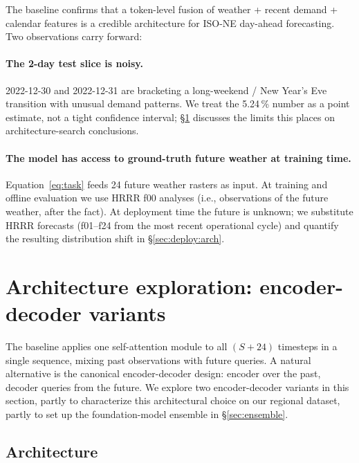 The baseline confirms that a token-level fusion of weather + recent demand + calendar features is a credible architecture for ISO-NE day-ahead forecasting. Two observations carry forward:

\paragraph{The 2-day test slice is noisy.} 2022-12-30 and 2022-12-31 are bracketing a long-weekend / New Year's Eve transition with unusual demand patterns. We treat the 5.24\,\% number as a point estimate, not a tight confidence interval; \S\ref{sec:archsearch} discusses the limits this places on architecture-search conclusions.

\paragraph{The model has access to ground-truth future weather at training time.} Equation~\ref{eq:task} feeds 24 future weather rasters as input. At training and offline evaluation we use HRRR f00 analyses (i.e., observations of the future weather, after the fact). At deployment time the future is unknown; we substitute HRRR forecasts (f01--f24 from the most recent operational cycle) and quantify the resulting distribution shift in \S\ref{sec:deploy:arch}.

\section{Architecture exploration: encoder-decoder variants}
\label{sec:archsearch}

The baseline applies one self-attention module to all $(S+24)$ timesteps in a single sequence, mixing past observations with future queries. A natural alternative is the canonical encoder-decoder design: encoder over the past, decoder queries from the future. We explore two encoder-decoder variants in this section, partly to characterize this architectural choice on our regional dataset, partly to set up the foundation-model ensemble in \S\ref{sec:ensemble}.

\subsection{Architecture}
\label{sec:archsearch:arch}

